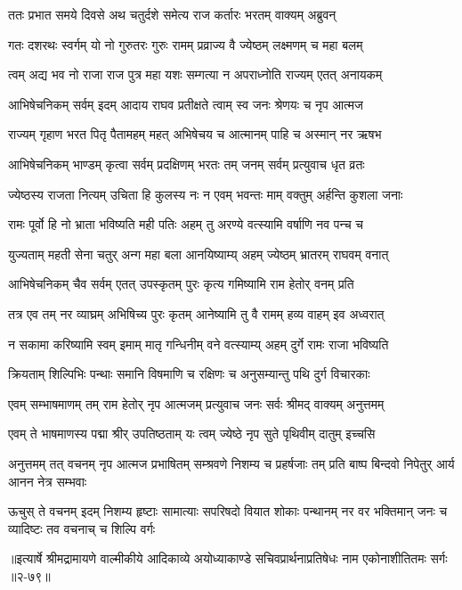 
\twolineshloka
{ततः प्रभात समये दिवसे अथ चतुर्दशे}
{समेत्य राज कर्तारः भरतम् वाक्यम् अब्रुवन्} %

\twolineshloka
{गतः दशरथः स्वर्गम् यो नो गुरुतरः गुरुः}
{रामम् प्रव्राज्य वै ज्येष्ठम् लक्ष्मणम् च महा बलम्} %

\twolineshloka
{त्वम् अद्य भव नो राजा राज पुत्र महा यशः}
{सम्गत्या न अपराध्नोति राज्यम् एतत् अनायकम्} %

\twolineshloka
{आभिषेचनिकम् सर्वम् इदम् आदाय राघव}
{प्रतीक्षते त्वाम् स्व जनः श्रेणयः च नृप आत्मज} %

\twolineshloka
{राज्यम् गृहाण भरत पितृ पैतामहम् महत्}
{अभिषेचय च आत्मानम् पाहि च अस्मान् नर ऋषभ} %

\twolineshloka
{आभिषेचनिकम् भाण्डम् कृत्वा सर्वम् प्रदक्षिणम्}
{भरतः तम् जनम् सर्वम् प्रत्युवाच धृत व्रतः} %

\twolineshloka
{ज्येष्ठस्य राजता नित्यम् उचिता हि कुलस्य नः}
{न एवम् भवन्तः माम् वक्तुम् अर्हन्ति कुशला जनाः} %

\twolineshloka
{रामः पूर्वो हि नो भ्राता भविष्यति मही पतिः}
{अहम् तु अरण्ये वत्स्यामि वर्षाणि नव पन्च च} %

\twolineshloka
{युज्यताम् महती सेना चतुर् अन्ग महा बला}
{आनयिष्याम्य् अहम् ज्येष्ठम् भ्रातरम् राघवम् वनात्} %

\twolineshloka
{आभिषेचनिकम् चैव सर्वम् एतत् उपस्कृतम्}
{पुरः कृत्य गमिष्यामि राम हेतोर् वनम् प्रति} %

\twolineshloka
{तत्र एव तम् नर व्याघ्रम् अभिषिच्य पुरः कृतम्}
{आनेष्यामि तु वै रामम् हव्य वाहम् इव अध्वरात्} %

\twolineshloka
{न सकामा करिष्यामि स्वम् इमाम् मातृ गन्धिनीम्}
{वने वत्स्याम्य् अहम् दुर्गे रामः राजा भविष्यति} %

\twolineshloka
{क्रियताम् शिल्पिभिः पन्थाः समानि विषमाणि च}
{रक्षिणः च अनुसम्यान्तु पथि दुर्ग विचारकाः} %

\twolineshloka
{एवम् सम्भाषमाणम् तम् राम हेतोर् नृप आत्मजम्}
{प्रत्युवाच जनः सर्वः श्रीमद् वाक्यम् अनुत्तमम्} %

\twolineshloka
{एवम् ते भाषमाणस्य पद्मा श्रीर् उपतिष्ठताम्}
{यः त्वम् ज्येष्ठे नृप सुते पृथिवीम् दातुम् इच्चसि} %

\fourlineindentedshloka
{अनुत्तमम् तत् वचनम् नृप आत्मज}
{प्रभाषितम् सम्श्रवणे निशम्य च}
{प्रहर्षजाः तम् प्रति बाष्प बिन्दवो}
{निपेतुर् आर्य आनन नेत्र सम्भवाः} %

\fourlineindentedshloka
{ऊचुस् ते वचनम् इदम् निशम्य हृष्टाः}
{सामात्याः सपरिषदो वियात शोकाः}
{पन्थानम् नर वर भक्तिमान् जनः च}
{व्यादिष्टः तव वचनाच् च शिल्पि वर्गः} %


॥इत्यार्षे श्रीमद्रामायणे वाल्मीकीये आदिकाव्ये अयोध्याकाण्डे सचिवप्रार्थनाप्रतिषेधः नाम एकोनाशीतितमः सर्गः ॥२-७९॥
